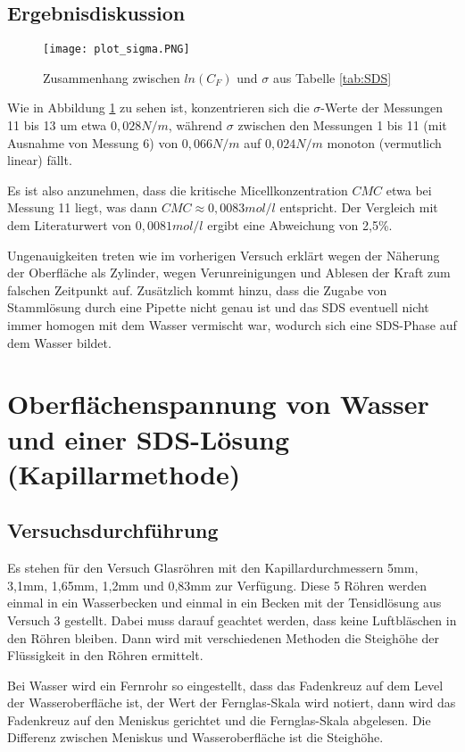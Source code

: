 \documentclass{scrartcl}
\begin{document}
\subsection{Ergebnisdiskussion}

\begin{figure}[H]
  \centering
    \texttt{[image: plot\_sigma.PNG]}
  \caption{Zusammenhang zwischen $ln(C_{F})$ und $\sigma$ aus Tabelle \ref{tab:SDS}}
  \label{fig:plot_sigma}
\end{figure}

Wie in Abbildung \ref{fig:plot_sigma} zu sehen ist, konzentrieren sich die $\sigma$-Werte der Messungen 11 bis 13 um etwa $0,028N/m$, während $\sigma$ zwischen den Messungen 1 bis 11 (mit Ausnahme von Messung 6) von $0,066N/m$ auf $0,024N/m$ monoton (vermutlich linear) fällt.

Es ist also anzunehmen, dass die kritische Micellkonzentration $CMC$ etwa bei Messung 11 liegt, was dann $CMC \approx 0,0083 mol/l$ entspricht. Der Vergleich mit dem Literaturwert von $0,0081 mol/l$ ergibt eine Abweichung von 2,5\%.

Ungenauigkeiten treten wie im vorherigen Versuch erklärt wegen der Näherung der Oberfläche als Zylinder, wegen Verunreinigungen und Ablesen der Kraft zum falschen Zeitpunkt auf.
Zusätzlich kommt hinzu, dass die Zugabe von Stammlösung durch eine Pipette nicht genau ist und das SDS eventuell nicht immer homogen mit dem Wasser vermischt war, wodurch sich eine SDS-Phase auf dem Wasser bildet.
\newpage 
\section{Oberflächenspannung von Wasser und einer SDS-Lösung (Kapillarmethode)}
\subsection{Versuchsdurchführung}
Es stehen für den Versuch Glasröhren mit den Kapillardurchmessern 5mm, 3,1mm, 1,65mm, 1,2mm und 0,83mm zur Verfügung. Diese 5 Röhren werden einmal in ein Wasserbecken und einmal in ein Becken mit der Tensidlösung aus Versuch 3 gestellt. Dabei muss darauf geachtet werden, dass keine Luftbläschen in den Röhren bleiben. Dann wird mit verschiedenen Methoden die Steighöhe der Flüssigkeit in den Röhren ermittelt.

Bei Wasser wird ein Fernrohr so eingestellt, dass das Fadenkreuz auf dem Level der Wasseroberfläche ist, der Wert der Fernglas-Skala wird notiert, dann wird das Fadenkreuz auf den Meniskus gerichtet und die Fernglas-Skala abgelesen. Die Differenz zwischen Meniskus und Wasseroberfläche ist die Steighöhe.
\end{document}
